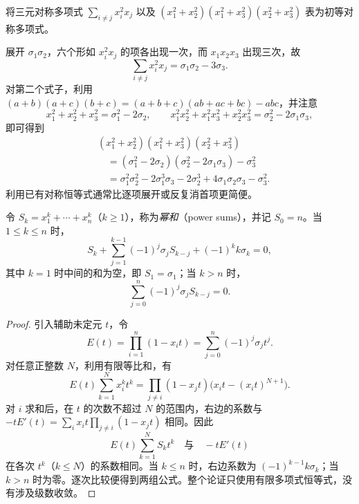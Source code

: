 \begin{example}
将三元对称多项式 $\sum_{i\ne j}x_i^2x_j$ 以及 $(x_1^2+x_2^2)(x_1^2+x_3^2)(x_2^2+x_3^2)$ 表为初等对称多项式。
\end{example}
\begin{solve}
展开 $\sigma_1\sigma_2$，六个形如 $x_i^2x_j$ 的项各出现一次，而 $x_1x_2x_3$ 出现三次，故
\[
    \sum_{i\ne j}x_i^2x_j=\sigma_1\sigma_2-3\sigma_3.
\]
对第二个式子，利用 $(a+b)(a+c)(b+c)=(a+b+c)(ab+ac+bc)-abc$，并注意
\[
    x_1^2+x_2^2+x_3^2=\sigma_1^2-2\sigma_2,
    \qquad
    x_1^2x_2^2+x_1^2x_3^2+x_2^2x_3^2=\sigma_2^2-2\sigma_1\sigma_3,
\]
即可得到
\[
\begin{aligned}
    &(x_1^2+x_2^2)(x_1^2+x_3^2)(x_2^2+x_3^2)\\
    &\quad=(\sigma_1^2-2\sigma_2)(\sigma_2^2-2\sigma_1\sigma_3)-\sigma_3^2\\
    &\quad=\sigma_1^2\sigma_2^2-2\sigma_1^3\sigma_3-2\sigma_2^3
    +4\sigma_1\sigma_2\sigma_3-\sigma_3^2.
\end{aligned}
\]
利用已有对称恒等式通常比逐项展开或反复消首项更简便。
\end{solve}

\begin{proposition}[Newton 公式]
\label{prop:newton-identities}
令 $S_k=x_1^k+\cdots+x_n^k$（$k\geq1$），称为\emph{幂和}（power sums），并记 $S_0=n$。当 $1\leq k\leq n$ 时，
\begin{equation}
\label{eq:newton-identities-low}
    S_k+\sum_{j=1}^{k-1}(-1)^j\sigma_jS_{k-j}+(-1)^kk\sigma_k=0,
\end{equation}
其中 $k=1$ 时中间的和为空，即 $S_1=\sigma_1$；当 $k>n$ 时，
\begin{equation}
\label{eq:newton-identities-high}
    \sum_{j=0}^n(-1)^j\sigma_jS_{k-j}=0.
\end{equation}
\end{proposition}
\begin{proof}
引入辅助未定元 $t$，令
\[
    E(t)=\prod_{i=1}^n(1-x_it)=\sum_{j=0}^n(-1)^j\sigma_jt^j.
\]
对任意正整数 $N$，利用有限等比和，有
\[
    E(t)\sum_{k=1}^N x_i^kt^k
    =\prod_{j\ne i}(1-x_jt)\bigl(x_it-(x_it)^{N+1}\bigr).
\]
对 $i$ 求和后，在 $t$ 的次数不超过 $N$ 的范围内，右边的系数与 $-tE'(t)=\sum_i x_it\prod_{j\ne i}(1-x_jt)$ 相同。因此
\[
    E(t)\sum_{k=1}^N S_kt^k
    \quad\text{与}\quad -tE'(t)
\]
在各次 $t^k$（$k\leq N$）的系数相同。当 $k\leq n$ 时，右边系数为 $(-1)^{k-1}k\sigma_k$；当 $k>n$ 时为零。逐次比较便得到两组公式。整个论证只使用有限多项式恒等式，没有涉及级数收敛。
\end{proof}

